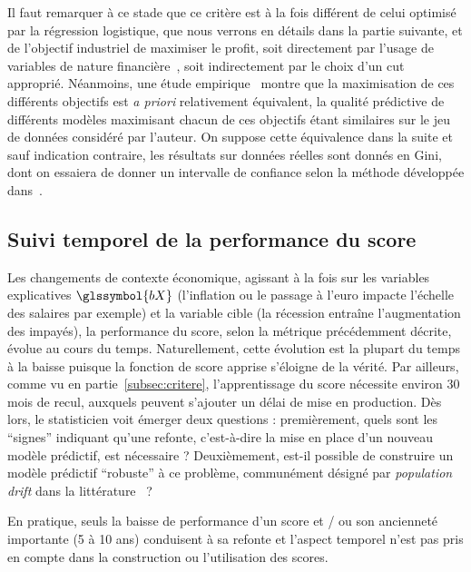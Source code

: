 Il faut remarquer à ce stade que ce critère est à la fois différent de celui optimisé par la régression logistique, que nous verrons en détails dans la partie suivante, et de l'objectif industriel de maximiser le profit, soit directement par l'usage de variables de nature financière~\cite{finlay2010credit}, soit indirectement par le choix d'un \gls{cut} approprié. Néanmoins, une étude empirique~\cite{finlay2009we} montre que la maximisation de ces différents objectifs est \textit{a priori} relativement équivalent, la qualité prédictive de différents modèles maximisant chacun de ces objectifs étant similaires sur le jeu de données considéré par l'auteur. On suppose cette équivalence dans la suite et sauf indication contraire, les résultats sur données réelles sont donnés en Gini, dont on essaiera de donner un intervalle de confiance selon la méthode développée dans~\cite{sun2014fast}.



\subsection{Suivi temporel de la performance du \gls{score}}

Les changements de contexte économique, agissant à la fois sur les variables explicatives $\glssymbol{bX}$ (l'inflation ou le passage à l'euro impacte l'échelle des salaires par exemple) et la variable cible (la récession entraîne l'augmentation des impayés), la performance du \gls{score}, selon la métrique précédemment décrite, évolue au cours du temps. Naturellement, cette évolution est la plupart du temps à la baisse puisque la fonction de \gls{score} apprise s'éloigne de la vérité. Par ailleurs, comme vu en partie~\ref{subsec:critere}, l'apprentissage du \gls{score} nécessite environ 30 mois de recul, auxquels peuvent s'ajouter un délai de mise en production. Dès lors, le statisticien voit émerger deux questions : premièrement, quels sont les ``signes'' indiquant qu'une refonte, c'est-à-dire la mise en place d'un nouveau modèle prédictif, est nécessaire ? Deuxièmement, est-il possible de construire un modèle prédictif ``robuste'' à ce problème, communément désigné par \textit{population drift} dans la littérature~\cite{hand1997statistical} ?

En pratique, seuls la baisse de performance d'un \gls{score} et / ou son ancienneté importante (5 à 10 ans) conduisent à sa refonte et l'aspect temporel n'est pas pris en compte dans la construction ou l'utilisation des \glspl{score}.

